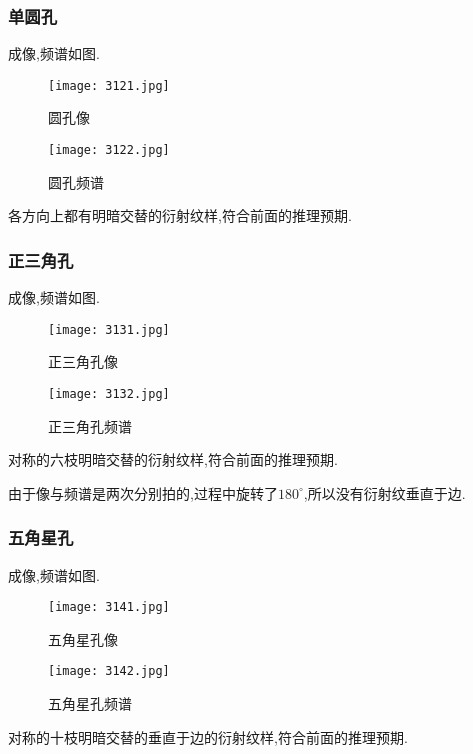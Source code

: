 \documentclass[10pt]{ctexart}
\begin{document}
\subsubsection{单圆孔}
成像,频谱如图.
\begin{figure}[H]
\begin{minipage}[t]{0.5\linewidth}
\centering
\texttt{[image: 3121.jpg]}
\caption{圆孔像} 
\end{minipage}
\hfill
\begin{minipage}[t]{0.5\linewidth}
\centering
\texttt{[image: 3122.jpg]}
\caption{圆孔频谱}
\end{minipage}
\end{figure}
各方向上都有明暗交替的衍射纹样,符合前面的推理预期.
\subsubsection{正三角孔}
成像,频谱如图.
\begin{figure}[H]
\begin{minipage}[t]{0.5\linewidth}
\centering
\texttt{[image: 3131.jpg]}
\caption{正三角孔像} 
\end{minipage}
\hfill
\begin{minipage}[t]{0.5\linewidth}
\centering
\texttt{[image: 3132.jpg]}
\caption{正三角孔频谱}
\end{minipage}
\end{figure}
对称的六枝明暗交替的衍射纹样,符合前面的推理预期.

由于像与频谱是两次分别拍的,过程中旋转了$180^\circ$,所以没有衍射纹垂直于边.
\subsubsection{五角星孔}
成像,频谱如图.
\begin{figure}[H]
\begin{minipage}[t]{0.5\linewidth}
\centering
\texttt{[image: 3141.jpg]}
\caption{五角星孔像} 
\end{minipage}
\hfill
\begin{minipage}[t]{0.5\linewidth}
\centering
\texttt{[image: 3142.jpg]}
\caption{五角星孔频谱}
\end{minipage}
\end{figure}
对称的十枝明暗交替的垂直于边的衍射纹样,符合前面的推理预期.
\end{document}
